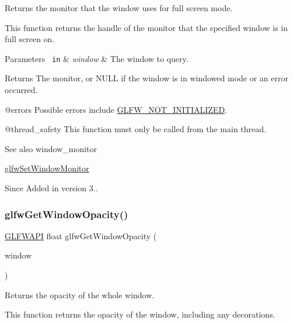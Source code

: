 Returns the monitor that the window uses for full screen mode. 

This function returns the handle of the monitor that the specified window is in full screen on.


\begin{DoxyParams}[1]{Parameters}
\mbox{\texttt{ in}}  & {\em window} & The window to query. \\
\hline
\end{DoxyParams}
\begin{DoxyReturn}{Returns}
The monitor, or {\ttfamily N\+U\+LL} if the window is in windowed mode or an error occurred.
\end{DoxyReturn}
@errors Possible errors include \mbox{\hyperlink{group__errors_ga2374ee02c177f12e1fa76ff3ed15e14a}{G\+L\+F\+W\+\_\+\+N\+O\+T\+\_\+\+I\+N\+I\+T\+I\+A\+L\+I\+Z\+ED}}.

@thread\+\_\+safety This function must only be called from the main thread.

\begin{DoxySeeAlso}{See also}
window\+\_\+monitor 

\mbox{\hyperlink{group__window_ga12fabf78575e59c00f822f323ae0b6ae}{glfw\+Set\+Window\+Monitor}}
\end{DoxySeeAlso}
\begin{DoxySince}{Since}
Added in version 3.. 
\end{DoxySince}
\mbox{\label{group__window_gad124d57a1c1c519f60c9765cd0c2a89c}} 
\subsubsection{\texorpdfstring{glfwGetWindowOpacity()}{glfwGetWindowOpacity()}}
{\footnotesize\ttfamily \mbox{\hyperlink{glfw3_8h_a56da5036b2cc259351ae22fd6439bb47}{G\+L\+F\+W\+A\+PI}} float glfw\+Get\+Window\+Opacity (\begin{DoxyParamCaption}\item[{\mbox{\hyperlink{group__window_ga3c96d80d363e67d13a41b5d1821f3242}{G\+L\+F\+Wwindow}} $\ast$}]{window }\end{DoxyParamCaption})}



Returns the opacity of the whole window. 

This function returns the opacity of the window, including any decorations.


